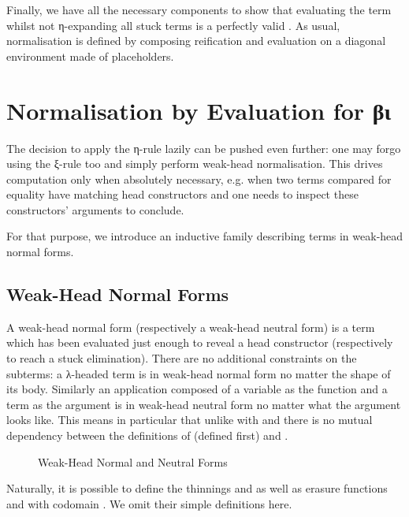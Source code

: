Finally, we have all the necessary components to show that evaluating
the term whilst not η-expanding all stuck terms is a perfectly valid
. As usual, normalisation is defined by composing
reification and evaluation on a diagonal environment made of placeholders.


\section{Normalisation by Evaluation for βι}

The decision to apply the η-rule lazily can be pushed even further: one may
forgo using the ξ-rule too and simply perform weak-head normalisation. This
drives computation only when absolutely necessary, e.g.
when two terms compared for equality have matching head constructors
and one needs to inspect these constructors' arguments to conclude.

For that purpose, we introduce an inductive family describing terms in weak-head
normal forms.

\subsection{Weak-Head Normal Forms}

A weak-head normal form (respectively a weak-head neutral form) is a term which has
been evaluated just enough to reveal a head constructor (respectively to reach a
stuck elimination). There are no additional constraints on the subterms: a λ-headed
term is in weak-head normal form no matter the shape of its body. Similarly an
application composed of a variable as the function and a term as the argument is in
weak-head neutral form no matter what the argument looks like. This means in particular
that unlike with  and  there is no mutual dependency between the definitions
of  (defined first) and .

\begin{figure}[h]
\caption{Weak-Head Normal and Neutral Forms\label{fig:weakhead}}
\end{figure}

Naturally, it is possible to define the thinnings
 and  as well as erasure
functions  and 
with codomain . We omit their simple definitions here.

